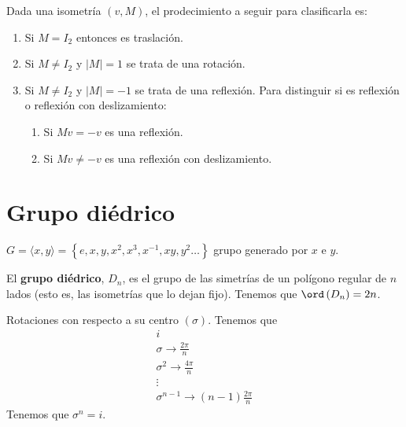 \begin{observation}
\normalfont Dada una isometría $\displaystyle \left(v,M\right) $, el prodecimiento a seguir para clasificarla es:
\begin{enumerate}
\item Si $\displaystyle M = I_{2} $ entonces es traslación.
\item Si $\displaystyle M \neq I_{2} $ y $\displaystyle \left|M\right| = 1 $ se trata de una rotación.
\item Si $\displaystyle M \neq I_{2} $ y $\displaystyle \left|M\right|=-1 $ se trata de una reflexión. Para distinguir si es reflexión o reflexión con deslizamiento:
\begin{enumerate}
\item Si $\displaystyle Mv = - v $ es una reflexión.
\item Si $\displaystyle Mv \neq - v $ es una reflexión con deslizamiento.
\end{enumerate}
\end{enumerate}
\end{observation}

\section{Grupo diédrico}

$\displaystyle G = \langle x,y \rangle = \left\{ e, x, y, x^{2}, x^{3}, x^{-1}, xy, y^{2} \ldots\right\}  $ grupo generado por $\displaystyle x $ e $\displaystyle y $.
\begin{fdefinition}
\normalfont El \textbf{grupo diédrico}, $\displaystyle D_{n} $, es el grupo de las simetrías de un polígono regular de $\displaystyle n $ lados (esto es, las isometrías que lo dejan fijo). Tenemos que $\displaystyle \ord\left(D_{n}\right) = 2n $.
\end{fdefinition}

\begin{eg}
\normalfont Rotaciones con respecto a su centro $\displaystyle \left(\sigma \right) $. Tenemos que 
\[
\begin{split}
i \\
\sigma \to \frac{2\pi }{n} \\
\sigma^{2} \to \frac{4\pi }{n} \\
\vdots \\
\sigma^{n-1} \to \left(n-1\right)\frac{2\pi }{n}
\end{split}
\]
Tenemos que $\displaystyle \sigma^{n} = i $.
\end{eg}

